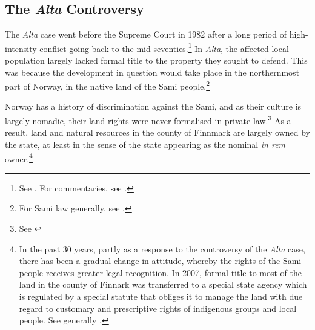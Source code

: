 


\subsection{The {\it Alta} Controversy}\label{sec:5:4:3}

The {\it Alta} case went before the Supreme Court in 1982 after a long period of high-intensity conflict going back to the mid-seventies.\footnote{See \cite{alta82}. For commentaries, see \cite{eckhoff82,boe83,hagvar88}.} In {\it Alta}, the affected local population largely lacked formal title to the property they sought to defend. This was because the development in question would take place in the northernmost part of Norway, in the native land of the Sami people.\footnote{For Sami law generally, see \cite{skogvang02}.}

Norway has a history of discrimination against the Sami, and as their culture is largely nomadic, their land rights were never formalised in private law.\footnote{See \cite[149-156]{ravna12s}} As a result, land and natural resources in the county of Finnmark are largely owned by the state, at least in the sense of the state appearing as the nominal {\it in rem} owner.\footnote{In the past 30 years, partly as a response to the controversy of the {\it Alta} case, there has been a gradual change in attitude, whereby the rights of the Sami people receives greater legal recognition. In 2007, formal title to most of the land in the county of Finnark was transferred to a special state agency which is regulated by a special statute that obliges it to manage the land with due regard to customary and prescriptive rights of indigenous  groups and local people. See generally \cite{bull07}.}

